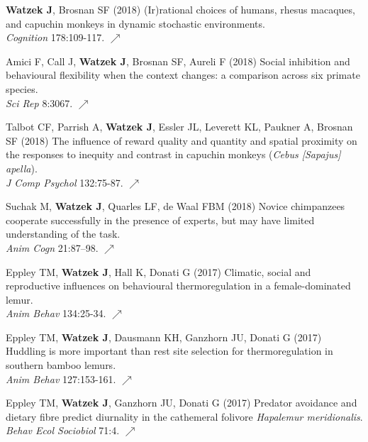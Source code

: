 \documentclass[]{friggeri-cv}
\begin{document}
\begin{enumerate}[label={[\,\arabic*\,]}]
  \item {\textbf{Watzek J}, Brosnan SF (2018) (Ir)rational choices of humans, rhesus macaques, and capuchin monkeys in dynamic stochastic environments. \\\emph{Cognition} 178:109-117. \href{https://doi.org/10.1016/j.cognition.2018.05.019}{\small $\nearrow$}}
  \item {Amici F, Call J, \textbf{Watzek J}, Brosnan SF, Aureli F (2018) Social inhibition and behavioural flexibility when the context changes: a comparison across six primate species. \\\emph{Sci Rep} 8:3067. \href{https://doi.org/10.1038/s41598-018-21496-6}{\small $\nearrow$}}
  \item {Talbot CF, Parrish A, \textbf{Watzek J}, Essler JL, Leverett KL, Paukner A, Brosnan SF (2018) The influence of reward quality and quantity and spatial proximity on the responses to inequity and contrast in capuchin monkeys (\emph{Cebus [Sapajus] apella}). \\\emph{J Comp Psychol} 132:75-87. \href{https://doi.org/10.1037/com0000088}{\small $\nearrow$}}
  \item {Suchak M, \textbf{Watzek J}, Quarles LF, de Waal FBM (2018) Novice chimpanzees cooperate successfully in the presence of experts, but may have limited understanding of the task. \\\emph{Anim Cogn} 21:87–98. \href{https://doi.org/10.1007/s10071-017-1142-2}{\small $\nearrow$}}
  \item {Eppley TM, \textbf{Watzek J}, Hall K, Donati G (2017) Climatic, social and reproductive influences on behavioural thermoregulation in a female-dominated lemur. \\\emph{Anim Behav} 134:25-34. \href{https://doi.org/10.1016/j.anbehav.2017.10.003}{\small $\nearrow$}}
  \item {Eppley TM, \textbf{Watzek J}, Dausmann KH, Ganzhorn JU, Donati G (2017) Huddling is more important than rest site selection for thermoregulation in southern bamboo lemurs. \\\emph{Anim Behav} 127:153-161. \href{https://doi.org/10.1016/j.anbehav.2017.03.019}{\small $\nearrow$}}
  \item {Eppley TM, \textbf{Watzek J}, Ganzhorn JU, Donati G (2017) Predator avoidance and dietary fibre predict diurnality in the cathemeral folivore \emph{Hapalemur meridionalis}. \\\emph{Behav Ecol Sociobiol} 71:4. \href{https://doi.org/10.1007/s00265-016-2247-3}{\small $\nearrow$}} 
\end{enumerate}
\end{document}
